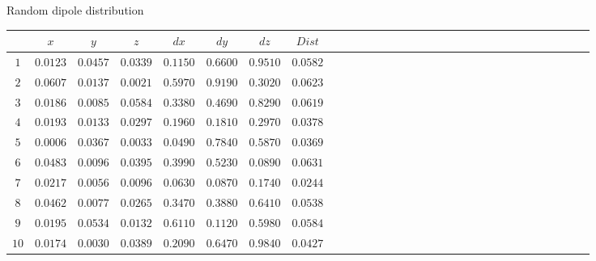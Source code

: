 \documentclass[t,12pt,english
\ifx\beamermode\undefined\else,\beamermode\fi
]{beamer}
\begin{document}
\begin{frame}{Random dipole distribution}
 
\begin{table}[!htbp]
\tiny
\centering
\begin{tabular}{c c c c c c c c c c c c c c c c c c c c c c c c c c c c c c c } 
   \hline 
$   $&$x$&$y$&$z$&$dx$&$dy$&$dz$&$Dist$\\
   \hline 
$1$&$0.0123$&$0.0457 $&$0.0339$&$0.1150  $&$ 0.6600$&$ 0.9510$&$0.0582$\\
$2$&$ 0.0607$&$ 0.0137$&$0.0021$&$ 0.5970 $& $0.9190$&$ 0.3020$&$0.0623$\\
$3$&$ 0.0186$&$ 0.0085$&$ 0.0584$&$ 0.3380$&$ 0.4690$&$ 0.8290$&$0.0619$\\
$4$&$ 0.0193$&$ 0.0133$&$ 0.0297$&$ 0.1960$&$ 0.1810$&$ 0.2970$&$0.0378$\\
$5$&$ 0.0006$&$ 0.0367$&$ 0.0033$&$ 0.0490$&$ 0.7840$&$ 0.5870$&$0.0369$\\
$6$&$ 0.0483$&$ 0.0096$&$ 0.0395$&$ 0.3990$&$ 0.5230$&$ 0.0890$&$0.0631$\\
$7$&$ 0.0217$&$ 0.0056$&$ 0.0096$&$ 0.0630$&$ 0.0870$&$ 0.1740$&$0.0244$\\
$8$&$ 0.0462$&$ 0.0077$&$ 0.0265$&$ 0.3470$&$ 0.3880$&$ 0.6410$&$0.0538$\\
$9$&$ 0.0195$&$ 0.0534$&$ 0.0132$&$ 0.6110$&$ 0.1120$&$ 0.5980$&$0.0584$\\
$10$&$ 0.0174$&$ 0.0030$&$ 0.0389$&$ 0.2090$&$ 0.6470$&$ 0.9840$&$0.0427$\\

\hline 

\end{tabular}
\end{table}

    
\end{frame}
\end{document}
